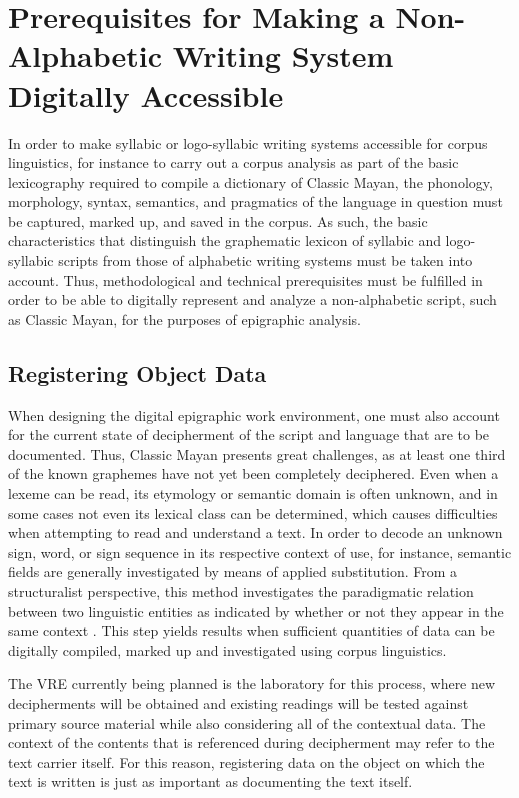 \documentclass[amsthm,ebook]{saparticle}
\begin{document}
\section[Prerequisites for Making a Non{}-Alphabetic Writing System Digitally Accessible]{Prerequisites for
Making a Non-Alphabetic Writing System Digitally Accessible}
\noindent In order to make syllabic or logo-syllabic writing systems accessible for corpus linguistics, for instance to carry out
a corpus analysis as part of the basic lexicography required to compile a dictionary of Classic Mayan, the phonology,
morphology, syntax, semantics, and pragmatics of the language in question must be captured, marked up, and saved in the
corpus. As such, the basic characteristics that distinguish the graphematic lexicon of syllabic and logo-syllabic
scripts from those of alphabetic writing systems must be taken into account. Thus, methodological and technical
prerequisites must be fulfilled in order to be able to digitally represent and analyze a non-alphabetic script, such as
Classic Mayan, for the purposes of epigraphic analysis.

\subsection[Registering Object Data ]{Registering Object Data}
\noindent When designing the digital epigraphic work environment, one must also account for the current state of decipherment of
the script and language that are to be documented. Thus, Classic Mayan presents great challenges, as at least one third
of the known graphemes have not yet been completely deciphered. Even when a lexeme can be read, its etymology or
semantic domain is often unknown, and in some cases not even its lexical class can be determined, which causes
difficulties when attempting to read and understand a text. In order to decode an unknown sign, word, or sign sequence
in its respective context of use, for instance, semantic fields are generally investigated by means of applied
substitution. From a structuralist perspective, this method investigates the paradigmatic relation between two
linguistic entities as indicated by whether or not they appear in the same context \citep{Bussmann2002}. This step yields
results when sufficient quantities of data can be digitally compiled, marked up and investigated using corpus
linguistics. 

The VRE currently being planned is the laboratory for this process, where new decipherments will be obtained and
existing readings will be tested against primary source material while also considering all of the contextual data. The
context of the contents that is referenced during decipherment may refer to the text carrier itself. For this reason,
registering data on the object on which the text is written is just as important as documenting the text itself. 
\end{document}
